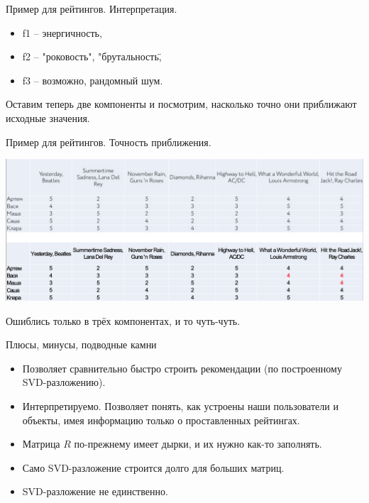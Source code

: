 \documentclass[9pt]{beamer}
\begin{document}
\begin{frame}{Пример для рейтингов. Интерпретация.}
\begin{itemize}
    \item f1 -- энергичность,
    \item f2 -- "роковость", "брутальность\",
    \item f3 -- возможно, рандомный шум.
\end{itemize}
Оставим теперь две компоненты и посмотрим, насколько точно они приближают исходные значения.
\end{frame}

\begin{frame}{Пример для рейтингов. Точность приближения.}
\begin{center}
    \includegraphics[width=\textwidth]{img/user_item_example_3.png}
\end{center}
Ошиблись только в трёх компонентах, и то чуть-чуть.
\end{frame}

\begin{frame}{Плюсы, минусы, подводные камни}
\begin{itemize}
    \item Позволяет сравнительно быстро строить рекомендации (по построенному SVD-разложению).
    \item Интерпретируемо. Позволяет понять, как устроены наши пользователи и объекты, имея информацию только о проставленных рейтингах.
    \item Матрица $R$ по-прежнему имеет дырки, и их нужно как-то заполнять.
    \item Само SVD-разложение строится долго для больших матриц.
    \item SVD-разложение не единственно.
\end{itemize}
\end{frame}
\end{document}
